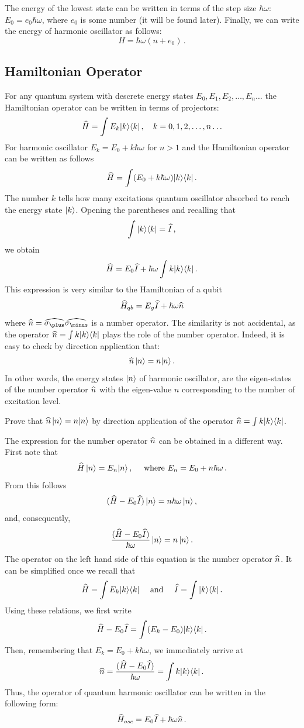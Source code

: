 The energy of the lowest state can be written in terms of the step size $\hbar\omega$: $E_0=e_0\hbar\omega$, where $e_0$ is some number (it will be found later). Finally, we can write the energy of harmonic oscillator as follows:
\[
H=\hbar\omega(n + e_0)\,.
\]

\subsection{Hamiltonian Operator}
For any quantum system with descrete energy states $E_0, E_1, E_2,\ldots, E_n\ldots$ the Hamiltonian operator can be written in terms of projectors:
\[
\widehat{H}=\int E_k|{k}\rangle\langle{k}|\,,\quad k=0,1,2,\ldots,n\ldots 
\]
For harmonic oscillator $E_k=E_0+k\hbar\omega$ for $n>1$ and the Hamiltonian operator can be written as follows
\[
\widehat{H} = \int (E_0+k\hbar\omega)|{k}\rangle\langle{k}|\,.
\]
The number $k$ tells how many excitations quantum oscillator absorbed to reach the energy state $|{k}\rangle$.
Opening the parentheses and recalling that
\[
\int|{k}\rangle\langle{k}|=\widehat{I}\,,
\] 
we obtain 
\[
\widehat{H} = E_0\widehat{I}+\hbar\omega \int k|{k}\rangle\langle{k}|\,.
\]
This expression is very similar to the Hamiltonian of a qubit 
\[
\widehat{H}_{qb}=E_g\widehat{I}+\hbar\omega\widehat{n}
\]
where $\op{n}=\op{\sigma_\plus}\op{\sigma_\minus}$ is a number operator. The similarity is not accidental, as the operator $\widehat{n}=\int k|{k}\rangle\langle{k}|$ plays the role of the number operator. Indeed, it is easy to check by direction application that:
\[
\widehat{n}\,|{n}\rangle=n|{n}\rangle\,.
\]
In other words, the energy states $|{n}\rangle$ of harmonic oscillator, are the eigen-states of the number operator $\widehat{n}$ with the eigen-value $n$ corresponding to the number of excitation level.
\begin{exercise}
	Prove that $\widehat{n}\,|{n}\rangle=n|{n}\rangle$ by direction application of the operator $\widehat{n}=\int k|{k}\rangle\langle{k}|$.
\end{exercise}

The expression for the number operator $\widehat{n}$ can be obtained in a different way. First note that
\[
\widehat{H}\,|{n}\rangle=E_n|{n}\rangle\,,\quad\textrm{ where } E_n = E_0 + n\hbar\omega\,.
\]
From this follows
\[
(\widehat{H}-E_0\widehat{I})\,|{n}\rangle=n\hbar\omega\,|{n}\rangle\,,
\]
and, consequently, 
\[
\frac{(\widehat{H}-E_0\widehat{I})}{\hbar\omega}\,|{n}\rangle=n\,|{n}\rangle\,.
\]
The operator on the left hand side of this equation is the number operator $\widehat{n}$. It can be simplified once we recall that
\[
\widehat{H}=\int E_k|{k}\rangle\langle{k}|\quad\textrm{ and }\quad \widehat{I}=\int|{k}\rangle\langle{k}|\,.
\]
Using these relations, we first write
\[
\widehat{H}-E_0\widehat{I}=\int (E_k-E_0)|{k}\rangle\langle{k}|\,.
\]
Then, remembering that $E_k=E_0+k\hbar\omega$, we immediately arrive at
\[
\widehat{n}=\frac{(\widehat{H}-E_0\widehat{I})}{\hbar\omega}=\int k|{k}\rangle\langle{k}|\,.
\]
Thus, the operator of quantum harmonic oscillator can be written in the following form:
\[
\widehat{H}_{osc}=E_0\widehat{I}+\hbar\omega\widehat{n}\,.
\]
